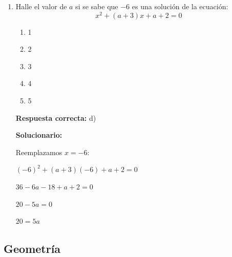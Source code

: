 \begin{enumerate}[resume]
\begin{center}
		\end{center}
		
		$CS = \langle -\infty, 1 ] \cup \langle 2, +\infty \rangle$ \\
		\fbox{$\equiv \mathbb{R} - \langle 1, 2 ]$}

	
	\vspace{6mm}
	
	\item Halle el valor de $a$ si se sabe que $-6$ es una solución de la ecuación:
	\[ x^2 + (a+3)x + a+2 = 0 \]
	
	\begin{enumerate}[label=\alph*)]
		\item 1
		\item 2
		\item 3
		\item 4
		\item 5
	\end{enumerate}
	\textbf{Respuesta correcta:} d)
	
	\vspace{2mm}
	\textbf{Solucionario:}
	
	
	Reemplazamos $x = -6$:
	
	$ (-6)^2 + (a+3)(-6) + a+2 = 0 $
	
	$ 36 - 6a - 18 + a + 2 = 0 $
	
	$ 20 - 5a = 0 $
	
	$ 20 = 5a $
	
	
	\vspace{6mm}
	
\end{enumerate}




\subsection*{Geometría}


